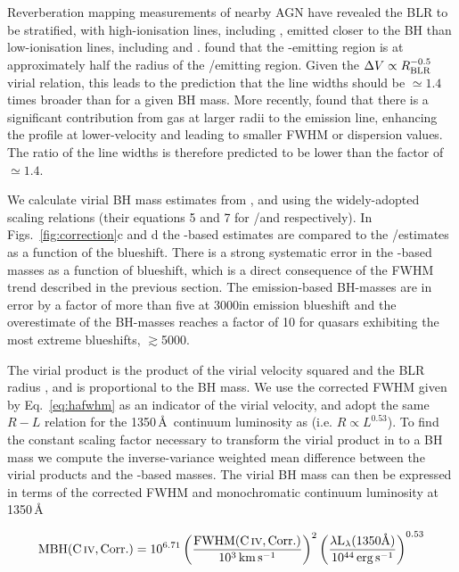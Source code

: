 Reverberation mapping measurements of nearby AGN have revealed the BLR to be stratified, with high-ionisation lines, including , emitted closer to the BH than low-ionisation lines, including \ha and \hb \citep[e.g.][]{onken02}.
\citet{vestergaard06} found that the -emitting region is at approximately half the radius of the \hbns/\ha emitting region.
Given the $\Delta V \propto R_{\rm BLR}^{-0.5}$ virial relation, this leads to the prediction that the  line widths should be $\simeq 1.4$ times broader than \ha for a given BH mass. 
More recently, \citet{denney12} found that there is a significant contribution from gas at larger radii to the  emission line, enhancing the profile at lower-velocity and leading to smaller FWHM or dispersion values. 
The ratio of the line widths is therefore predicted to be lower than the factor of $\simeq 1.4$. 

We calculate virial BH mass estimates from , \ha and \hb using the widely-adopted \citet{vestergaard06} scaling relations (their equations 5 and 7 for \hans/\hb and  respectively). 
In Figs.~\ref{fig:correction}c and d the -based estimates are compared to the \hans/\hb estimates as a function of the  blueshift. 
There is a strong systematic error in the -based masses as a function of blueshift, which is a direct consequence of the FWHM trend described in the previous section. 
The  emission-based BH-masses are in error by a factor of more than five at 3000\kms in  emission blueshift and the overestimate of the BH-masses reaches a factor of 10 for quasars exhibiting the most extreme blueshifts, $\gtrsim$5000\kms. 

The virial product is the product of the virial velocity squared and the BLR radius \citep[e.g.][]{shen13}, and is proportional to the BH mass. 
We use the corrected  FWHM given by Eq.~\ref{eq:hafwhm} as an indicator of the virial velocity, and adopt the same $R-L$ relation for the 1350\,\AA\, continuum luminosity as \citet{vestergaard06} (i.e. $R \propto L^{0.53}$). 
To find the constant scaling factor necessary to transform the virial product in to a BH mass we compute the inverse-variance weighted mean difference between the virial products and the \hans-based masses. 
The virial BH mass can then be expressed in terms of the corrected  FWHM and monochromatic continuum luminosity at 1350\,\AA

\begin{equation}
  \label{eq:masscorrection}
  {\rm MBH}(\rm{C}\,\textsc{iv}, \rm{Corr.}) = 10^{6.71}\left( \frac{\rm{FWHM}(\rm{C}\,\textsc{iv}, \rm{Corr.})}{10^3 {\rm \,km\,s^{-1}}} \right)^2 \left( \frac{\lambda {\rm L}_{\lambda} (1350 \text{\AA}) }{10^{44} {\rm \,erg\,s^{-1}}}  \right)^{0.53}
\end{equation}

